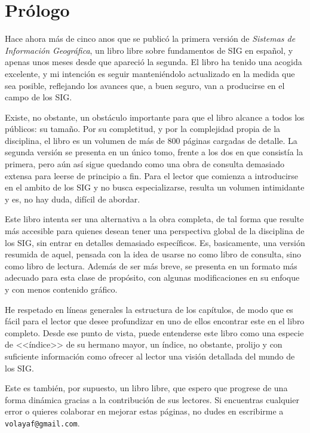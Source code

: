 \chapter*{Prólogo}

Hace ahora más de cinco anos que se publicó la primera versión de \textit{Sistemas de Información Geográfica}, un libro libre sobre fundamentos de SIG en español, y apenas unos meses desde que apareció la segunda. El libro ha tenido una acogida excelente, y mi intención es seguir manteniéndolo actualizado en la medida que sea posible, reflejando los avances que, a buen seguro, van a producirse en el campo de los SIG.

Existe, no obstante, un obstáculo importante para que el libro alcance a todos los públicos: su tamaño. Por su completitud, y por la complejidad propia de la disciplina, el libro es un volumen de más de 800 páginas cargadas de detalle. La segunda versión se presenta en un único tomo, frente a los dos en que consistía la primera, pero aún así sigue quedando como una obra de consulta demasiado extensa para leerse de principio a fin. Para el lector que comienza a introducirse en el ambito de los SIG y no busca especializarse, resulta un volumen intimidante y es, no hay duda, difícil de abordar.

Este libro intenta ser una alternativa a la obra completa, de tal forma que resulte más accesible para quienes desean tener una perspectiva global de la disciplina de los SIG, sin entrar en detalles demasiado específicos. Es, basicamente, una versión resumida de aquel, pensada con la idea de usarse no como libro de consulta, sino como libro de lectura. Además de ser más breve, se presenta en un formato más adecuado para esta clase de propósito, con algunas modificaciones en su enfoque y con menos contenido gráfico.

He respetado en líneas generales la estructura de los capítulos, de modo que es fácil para el lector que desee profundizar en uno de ellos encontrar este en el libro completo. Desde ese punto de vista, puede entenderse este libro como una especie de <<índice>> de su hermano mayor, un índice, no obstante, prolijo y con suficiente información como ofrecer al lector una visión detallada del mundo de los SIG.

Este es también, por supuesto, un libro libre, que espero que progrese de una forma dinámica gracias a la contribución de sus lectores. Si encuentras cualquier error o quieres colaborar en mejorar estas páginas, no dudes en escribirme a \\ \texttt{volayaf@gmail.com}.